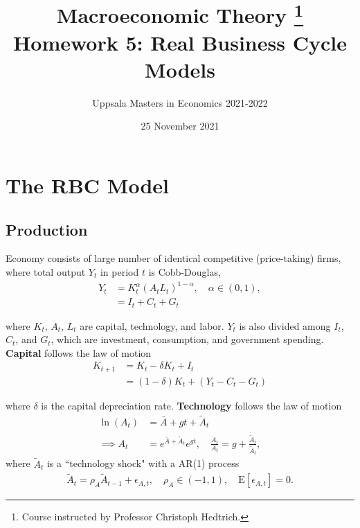\documentclass{article}
\title{ Macroeconomic Theory
        \thanks{Course instructed by Professor Christoph Hedtrich.} \\
        Homework 5: Real Business Cycle Models
        }
\author{
        Uppsala Masters in Economics 2021-2022
        }
\date{25 November 2021}
\newcommand{\E}[1]{\mathrm{E}\left[#1\right]}
\begin{document}
    
    \maketitle
    \section{The RBC Model}
    
    \subsection{Production}
        
        Economy consists of large number of identical competitive (price-taking) firms, where total output $Y_t$ in period $t$ is Cobb-Douglas,
        \begin{align}
            Y_t &= K_t^\alpha \left( A_t L_t\right)^{1-\alpha}, \quad \alpha \in (0, 1),
            \\
            &= I_t + C_t + G_t
        \end{align}
        
        where $K_t$, $A_t$, $L_t$ are capital, technology, and labor. $Y_t$ is also divided among $I_t$, $C_t$, and $G_t$, which are investment, consumption, and government spending. \textbf{Capital} follows the law of motion
        \begin{align}
            K_{t+1} &= K_t - \delta K_{t} + I_t \\
            &= (1 - \delta) K_{t} + (Y_t - C_t - G_t)
        \end{align}
        
        where $\delta$ is the capital depreciation rate. \textbf{Technology} follows the law of motion
        \begin{align}
            \ln(A_t) &= \bar{A} + gt + \tilde{A}_t
            \\
            \implies
            A_t
            &= e^{\bar{A} + \tilde{A}_t}e^{gt},
            \quad \frac{\dot{A}_t}{A_t}
            = g + \frac{\dot{\tilde{A}}_t}{\tilde{A}_t},
        \end{align}
        where $\tilde{A}_t$ is a ``technology shock" with a AR(1) process
        \begin{align}
            \tilde{A}_{t} = \rho_A \tilde{A}_{t-1} + \epsilon_{A, t},
            \quad \rho_A \in (-1, 1),
            \quad \E{\epsilon_{A, t}} = 0.
        \end{align}
        
\end{document}
